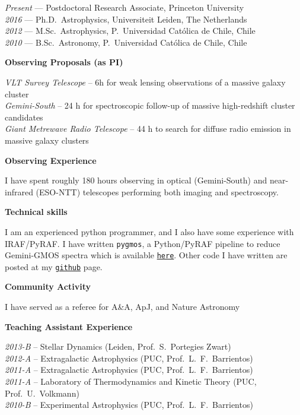 \documentclass[11pt]{article}
\newcommand\sectitle[1]{
  \vspace{0.5cm}
  \noindent
  \textbf{\large #1}\\
  \vspace{-0.2cm}
}
\begin{document}
\noindent
\emph{Present} --- Postdoctoral Research Associate, Princeton University\\
\emph{2016} --- Ph.D.~Astrophysics, Universiteit Leiden, The Netherlands\\
\emph{2012} --- M.Sc.~Astrophysics, P.~Universidad Cat\'olica de Chile, Chile\\
\emph{2010} --- B.Sc.~Astronomy, P.~Universidad Cat\'olica de Chile, Chile


\sectitle{Observing Proposals (as PI)}

\noindent
\emph{VLT Survey Telescope} -- 6h for weak lensing observations of a massive galaxy cluster\\
\emph{Gemini-South} -- 24 h for spectroscopic follow-up of massive high-redshift cluster candidates\\
\emph{Giant Metrewave Radio Telescope} -- 44 h to search for diffuse radio emission in massive galaxy clusters


\sectitle{Observing Experience}

I have spent roughly 180 hours observing in optical (Gemini-South) and near-infrared (ESO-NTT) telescopes performing both imaging and spectroscopy.


\sectitle{Technical skills}

I am an experienced python programmer, and I also have some experience with IRAF/PyRAF. I have written {\tt pygmos}, a Python/PyRAF pipeline to reduce Gemini-GMOS spectra which is available \href{https://github.com/cristobal-sifon/pygmos/}{\texttt{here}}. Other code I have written are posted at my \href{https://github.com/cristobal-sifon}{\texttt{github}} page.


%


\sectitle{Community Activity}

{I have served as a referee for A\&A, ApJ, and Nature Astronomy}



\sectitle{Teaching Assistant Experience}

\noindent
\emph{2013-B} -- Stellar Dynamics (Leiden, Prof.~S.~Portegies Zwart)\\
\emph{2012-A} -- Extragalactic Astrophysics (PUC, Prof.~L.~F.~Barrientos)\\
\emph{2011-A} -- Extragalactic Astrophysics (PUC, Prof.~L.~F.~Barrientos)\\
\emph{2011-A} -- Laboratory of Thermodynamics and Kinetic Theory (PUC, Prof.~U.~Volkmann)\\
\emph{2010-B} -- Experimental Astrophysics (PUC, Prof.~L.~F.~Barrientos)
\end{document}
